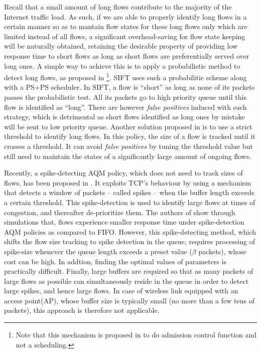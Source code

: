 \documentclass[preprint,12pt]{elsarticle}
\begin{document}
Recall that a small amount of long flows contribute to the majority of the Internet traffic load. As such, if we are able to properly identify long flows in a certain manner so as to mantain flow states for these long flows only which are limited instead of all flows, a significant overhead-saving for flow state keeping will be naturally obtained, retaining the desirable property of providing low response time to short flows as long as short flows are preferentially served over long ones. A simple way to achieve this is to apply a probabilistic method to detect long flows, as proposed in \cite{Kortebi04Xprotect,Psounis05Sift}\footnote{Note that this mechanism is proposed in \cite{Kortebi04Xprotect} to do admission control function and not a scheduling.}. SIFT\cite{Psounis05Sift} uses such a probabilitic scheme along with a PS+PS scheduler. In SIFT, a flow is ``short'' as long as none of its packets passes the probabilistic test. All its packets go to high priority queue until this flow is identified as ``long''. There are however \textit{false positives} induced with such strategy, which is detrimental as short flows identified as long ones by mistake will be sent to low priority queue. Another solution proposed in \cite{DivakaranCAP10} is to use a strict threshold to identify long flows. In this policy, the size of a flow is tracked until it crosses a threshold. It can avoid \textit{false positives} by tuning the threshold value but still need to maintain the states of a significantly large amount of ongoing flows. 

Recently, a spike-detecting AQM policy, which does not need to track sizes of flows, has been proposed in \cite{DivakaranAP11,Divakaran2012networks}. It exploits TCP's behaviour by using a mechanism that detects a window of packets -- called spikes -- when the buffer length exceeds a certain threshold. This spike-detection is used to identify large flows at times of congestion, and thereafter de-prioritize them. The authors of \cite{DivakaranAP11,Divakaran2012networks}  show through simulations that, flows experience smaller response time under spike-detection AQM policies as compared to FIFO. However, this spike-detecting method, which shifts the flow size tracking to spike detection in the queue, requires processing of spike-size  whenever the queue length exceeds a preset value ($\beta$ packets), whose cost can be high. In addtion, finding the optimal values of parameters is practically difficult.%
Finally, large buffers are required so that as many packets of large flows as possible can simultaneously reside in the queue in order to detect large spikes, and hence large flows. In case of wireless link equipped with an access point(AP), whose buffer size is typically small (no more than a few tens of packets), this approach is therefore not applicable.
\end{document}
